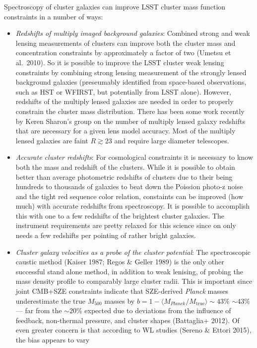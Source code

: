 Spectroscopy of cluster galaxies can improve LSST cluster mass function
constraints in a number of ways:
\begin{itemize}
  \item {\it Redshifts of multiply imaged background galaxies}: Combined strong
  and weak lensing measurements of clusters can improve both the cluster mass
  and concentration constraints by approximately a factor of two (Umetsu et
  al.~2010). So it is possible to improve the LSST cluster weak lensing
  constraints by combining strong lensing measurement of the strongly lensed
  background galaxies (preseumably identified from space-based observations,
  such as HST or WFIRST, but potentially from LSST alone). However, redshifts of
  the multiply lensed galaxies are needed in order to properly constrain the
  cluster mass distribution. There has been some work recently by Keren Sharon's
  group on the number of multiply lensed galaxy redshifts that are necessary for
  a given lens model accuracy. Most of the multiply lensed galaxies are faint $R
  \gtrsim 23$ and require large diameter telescopes.
  \item {\it Accurate cluster redshifts}: For cosmological constraints it is
  necessary to know both the mass and redshift of the clusters. While it is
  possible to obtain better than average photometric redshifts of clusters due
  to their being hundreds to thousands of galaxies to beat down the Poission
  photo-z noise and the tight red sequence color relation, constaints can be
  improved (how much) with accurate redshifts from spectroscopy. It is possible
  to accomplish this with one to a few redshifts of the brightest cluster
  galaxies. The instrument requirements are pretty relaxed for this science
  since on only needs a few redshifts per pointing of rather bright galaxies.
  \item {\it Cluster galaxy velocities as a probe of the cluster potential}: The
  spectroscopic caustic method (Kaiser 1987; Regos \& Geller 1989) is the only
  other successful stand alone method, in addition to weak lenising, of probing
  the mass density profile to comparably large cluster radii. This is important
  since joint CMB+SZE constraints indicate that SZE-derived {\em Planck} masses
  underestimate the true $M_{500}$ masses by $b=1-\langle
  M_{Planck}/M_\mathrm{true}\rangle\sim 43\%$ $\sim43\%$ --- far from the $\sim
  20\%$ expected due to deviations from the influence of feedback, non-thermal
  pressure, and cluster shapes (Battaglia+ 2012). Of even greater concern is
  that according to WL studies (Sereno \& Ettori 2015), the bias appears to vary

\end{itemize}
